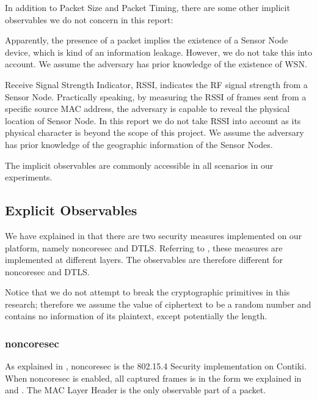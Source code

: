 In addition to Packet Size and Packet Timing, there are some other implicit observables we do not concern in this report:

\begin{description}[style=nextline]
	\item[Presence of Packets]
	Apparently, the presence of a packet implies the existence of a Sensor Node device, which is kind of an information leakage. However, we do not take this into account. We assume the adversary has prior knowledge of the existence of WSN.
	
	\item[RSSI]
	Receive Signal Strength Indicator, RSSI, indicates the RF signal strength from a Sensor Node. Practically speaking, by measuring the RSSI of frames sent from a specific source MAC address, the adversary is capable to reveal the physical location of Sensor Node. In this report we do not take RSSI into account as its physical character is beyond the scope of this project. We assume the adversary has prior knowledge of the geographic information of the Sensor Nodes.
\end{description}

The implicit observables are commonly accessible in all scenarios in our experiments.

\subsection{Explicit Observables}

We have explained in  that there are two security measures implemented on our platform, namely noncoresec and DTLS. Referring to , these measures are implemented at different layers. The observables are therefore different for noncoresec and DTLS. 

Notice that we do not attempt to break the cryptographic primitives in this research; therefore we assume the value of ciphertext to be a random number and contains no information of its plaintext, except potentially the length.

\subsubsection{noncoresec} \label{Subsubsec: Explicit noncoresec}

As explained in , noncoresec is the 802.15.4 Security implementation on Contiki. When noncoresec is enabled, all captured frames is in the form we explained in  and . The MAC Layer Header is the only observable part of a packet.

